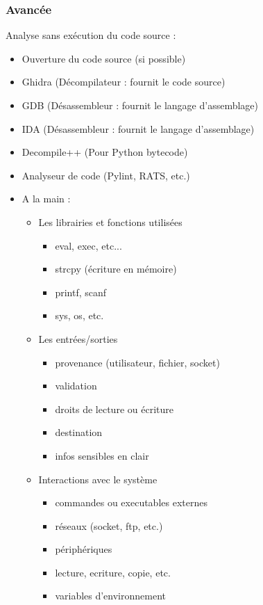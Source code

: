 \documentclass[a4paper]{article}
\begin{document}
\subsubsection{Avancée}
Analyse sans exécution du code source :
\begin{itemize}[label = \textbullet, font = \Large]
    \item Ouverture du code source (si possible)
    \item Ghidra (Décompilateur : fournit le code source)
    \item GDB (Désassembleur : fournit le langage d'assemblage)
    \item IDA (Désassembleur : fournit le langage d'assemblage)
    \item Decompile++ (Pour Python bytecode)
    \item Analyseur de code (Pylint, RATS, etc.)
    \item A la main :
    \begin{itemize}[label = $\hookrightarrow$, font = \Large]
        \item Les librairies et fonctions utilisées
        \begin{itemize}
            \item eval, exec, etc...
            \item strcpy (écriture en mémoire)
            \item printf, scanf
            \item sys, os, etc.
        \end{itemize}
        \item Les entrées/sorties
        \begin{itemize}
            \item provenance (utilisateur, fichier, socket)
            \item validation
            \item droits de lecture ou écriture
            \item destination
            \item infos sensibles en clair
        \end{itemize}
        \item Interactions avec le système
        \begin{itemize}
            \item commandes ou executables externes
            \item réseaux (socket, ftp, etc.)
            \item périphériques
            \item lecture, ecriture, copie, etc.
            \item variables d'environnement
        \end{itemize}
    \end{itemize}
\end{itemize}
\end{document}
